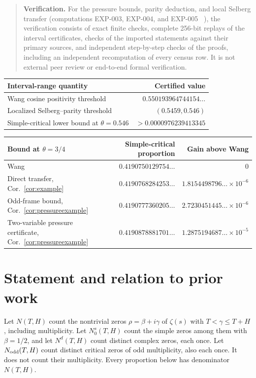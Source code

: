 \documentclass[11pt]{article}
\theoremstyle{remark}
\begin{document}
\begin{quote}\small
\textbf{Verification.} For the pressure bounds, parity deduction, and local
Selberg transfer (computations EXP-003, EXP-004, and EXP-005
~\cite{RecordIII,RecordIV,RecordV}), the
verification consists of exact finite checks, complete 256-bit replays of
the interval certificates, checks of the imported statements against their
primary sources, and independent step-by-step checks of the proofs,
including an independent recomputation of every census row. It is not
external peer review or end-to-end formal verification.
\end{quote}

\begin{center}\small
\begin{tabular}{lr}
\toprule
Interval-range quantity & Certified value\\
\midrule
Wang cosine positivity threshold & $0.550193964744154\ldots$\\
Localized Selberg--parity threshold & $(0.5459,0.546)$\\
Simple-critical lower bound at $\theta=0.546$ & $>0.0000976239413345$\\
\bottomrule
\end{tabular}
\end{center}

\begin{center}\small
\begin{tabular}{lrr}
\toprule
Bound at $\theta=3/4$ & Simple-critical proportion & Gain above Wang\\
\midrule
Wang & $0.4190750129754\ldots$ & $0$\\
Direct transfer, Cor.~\ref{cor:example} & $0.4190768284253\ldots$ & $1.8154498796\ldots\times10^{-6}$\\
Odd-frame bound, Cor.~\ref{cor:pressureexample} & $0.4190777360205\ldots$ & $2.7230451445\ldots\times10^{-6}$\\
Two-variable pressure certificate, Cor.~\ref{cor:pressureexample} & $0.4190878881701\ldots$ & $1.2875194687\ldots\times10^{-5}$\\
\bottomrule
\end{tabular}
\end{center}

\section{Statement and relation to prior work}

Let $N(T,H)$ count the nontrivial zeros $\rho=\beta+i\gamma$ of $\zeta(s)$
with $T<\gamma\le T+H$, including multiplicity. Let $N_0^s(T,H)$ count the
simple zeros among them with $\beta=1/2$, and let $N^d(T,H)$ count distinct
complex zeros, each once. Let $N_{\rm odd}(T,H)$ count distinct critical
zeros of odd multiplicity, also each once. It does not count their
multiplicity. Every proportion below has denominator $N(T,H)$.
\end{document}
